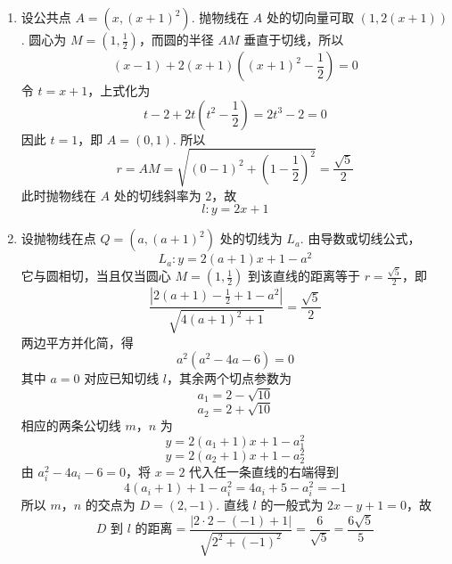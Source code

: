 \begin{solution}
\begin{enumerate}
\item 设公共点 \(A=(x,(x+1)^2)\). 抛物线在 \(A\) 处的切向量可取 \((1,2(x+1))\). 圆心为 \(M=(1,\frac12)\)，而圆的半径 \(AM\) 垂直于切线，所以
\[
(x-1)+2(x+1)\left((x+1)^2-\frac12\right)=0
\]
令 \(t=x+1\)，上式化为
\[
t-2+2t\left(t^2-\frac12\right)=2t^3-2=0
\]
因此 \(t=1\)，即 \(A=(0,1)\). 所以
\[
r=AM=\sqrt{(0-1)^2+\left(1-\frac12\right)^2}
=\frac{\sqrt5}{2}
\]
此时抛物线在 \(A\) 处的切线斜率为 \(2\)，故
\[
l:y=2x+1
\]

\item 设抛物线在点 \(Q=(a,(a+1)^2)\) 处的切线为 \(L_a\). 由导数或切线公式，
\[
L_a:y=2(a+1)x+1-a^2
\]
它与圆相切，当且仅当圆心 \(M=(1,\frac12)\) 到该直线的距离等于 \(r=\frac{\sqrt5}{2}\)，即
\[
\frac{\left|2(a+1)-\frac12+1-a^2\right|}
{\sqrt{4(a+1)^2+1}}=\frac{\sqrt5}{2}
\]
两边平方并化简，得
\[
a^2(a^2-4a-6)=0
\]
其中 \(a=0\) 对应已知切线 \(l\)，其余两个切点参数为
\[
a_1=2-\sqrt{10}
\]
\[
a_2=2+\sqrt{10}
\]
相应的两条公切线 \(m\)，\(n\) 为
\[
y=2(a_1+1)x+1-a_1^2
\]
\[
y=2(a_2+1)x+1-a_2^2
\]
由 \(a_i^2-4a_i-6=0\)，将 \(x=2\) 代入任一条直线的右端得到
\[
4(a_i+1)+1-a_i^2=4a_i+5-a_i^2=-1
\]
所以 \(m\)，\(n\) 的交点为 \(D=(2,-1)\). 直线 \(l\) 的一般式为 \(2x-y+1=0\)，故
\[
D\text{ 到 }l\text{ 的距离}
=\frac{|2\cdot2-(-1)+1|}{\sqrt{2^2+(-1)^2}}
=\frac6{\sqrt5}
=\frac{6\sqrt5}{5}
\]
\end{enumerate}
\end{solution}
